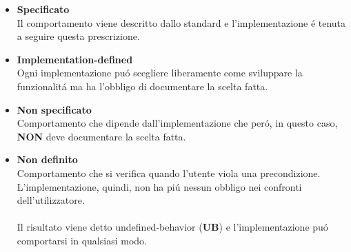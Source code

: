 \documentclass{article}
\begin{document}
\begin{itemize}
	\item \textbf{\textcolor{blu}{Specificato}}\\Il comportamento viene descritto dallo standard e l'implementazione \'e tenuta a seguire questa prescrizione.\\
	\item \textbf{\textcolor{blu}{Implementation-defined}}\\Ogni implementazione pu\'o scegliere liberamente come sviluppare la funzionalit\'a ma ha l'obbligo di documentare la scelta fatta.
	\item \textbf{\textcolor{blu}{Non specificato}}\\Comportamento che dipende dall'implementazione che per\'o, in questo caso, \textbf{NON} deve documentare la scelta fatta.\\
	\item \textbf{\textcolor{blu}{Non definito}}\\Comportamento che si verifica quando l'utente viola una precondizione.\\ L'implementazione, quindi, non ha pi\'u nessun obbligo nei confronti dell'utilizzatore.\\ \\ Il risultato viene detto undefined-behavior (\textbf{UB}) e l'implementazione pu\'o comportarsi in qualsiasi modo.
\end{itemize}
\end{document}
